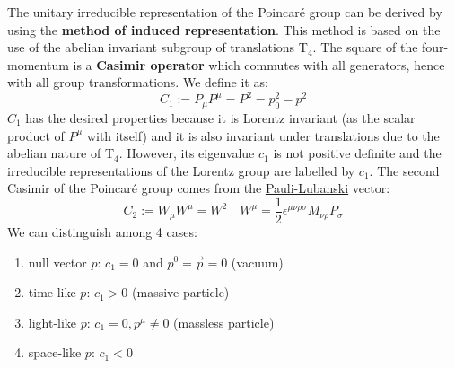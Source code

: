 \documentclass[../main.tex]{subfiles}
\begin{document}
The unitary irreducible representation of the Poincaré group can be derived by using the \textbf{method of induced representation}. This method is based on the use of the abelian invariant subgroup of translations T$_4$. The square of the four-momentum is a \textbf{Casimir operator} which commutes with all generators, hence with all group transformations. We define it as:
\[
C_1:=P_\mu P^\mu=P^2=p_0^2-p^2
\]
$C_1$ has the desired properties because it is Lorentz invariant (as the scalar product of $P^\mu$ with itself) and it is also invariant under translations due to the abelian nature of T$_4$. However, its eigenvalue $c_1$ is not positive definite and the irreducible representations of the Lorentz group are labelled by $c_1$. The second Casimir of the Poincaré group comes from the \href{https://en.wikipedia.org/wiki/Pauli-Lubanski_pseudovector}{Pauli-Lubanski} vector:
\[
C_2:=W_\mu W^\mu=W^2 \quad W^\mu=\frac{1}{2}\epsilon^{\mu\nu\rho\sigma}M_{\nu\rho}P_\sigma
\]
We can distinguish among 4 cases:
\begin{enumerate}
    \item null vector $p$: $c_1=0$ and $p^0=\Vec{p}=0$ (vacuum)
    \item time-like $p$: $c_1>0$ (massive particle)
    \item light-like $p$: $c_1=0, p^\mu\neq0$ (massless particle)
    \item space-like $p$: $c_1<0$
\end{enumerate}
\end{document}
